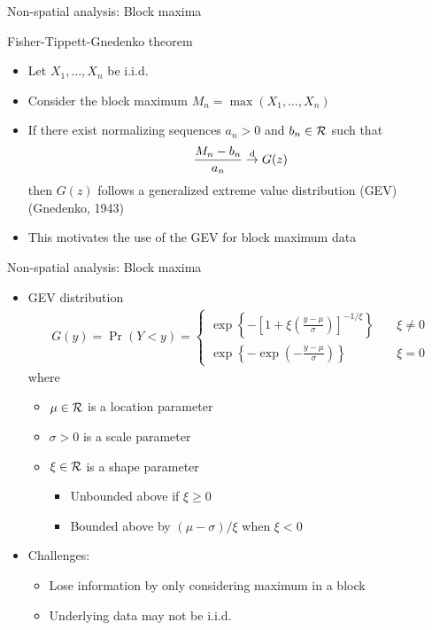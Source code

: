 \documentclass{beamer}
\begin{document}
 \begin{frame}{Non-spatial analysis: Block maxima}
 \begin{adjustwidth}{1em}{0em}
   Fisher-Tippett-Gnedenko theorem \vspace{1em}
   \begin{itemize} \setlength{\itemsep}{1em}
     \item Let $X_1, \ldots, X_n$ be i.i.d.
     \item Consider the block maximum $M_n = \max(X_1, \ldots, X_n)$
     \item If there exist normalizing sequences $a_n > 0$ and $b_n \in {\cal R}$ such that
     \begin{align*}
       \frac{ M_n - b_n }{ a_n } \stackrel{\mathrm{d}}{\rightarrow} G(z)
     \end{align*}
     then $G(z)$ follows a generalized extreme value distribution (GEV) (Gnedenko, 1943)
     \item This motivates the use of the GEV for block maximum data
   \end{itemize}
 \end{adjustwidth}
 \end{frame}

 \begin{frame}{Non-spatial analysis: Block maxima}
   \begin{itemize} \setlength{\itemsep}{1em}
     \item GEV distribution
     \begin{align*}
       G(y) = \Pr(Y < y) = \left\{  \begin{array}{ll}
         \exp\left\{ -\left[ 1 + \xi \left( \frac{ y - \mu }{ \sigma } \right) \right]^{ -1 / \xi} \right\} & \quad \xi \neq 0 \\[0.5em]
         \exp \left\{ -\exp \left( - \frac{ y - \mu }{ \sigma} \right) \right\} & \quad \xi = 0
       \end{array}\right.
     \end{align*}
     where
     \begin{itemize} \setlength{\itemsep}{0.25em}
       \item $\mu \in {\cal R}$ is a location parameter
       \item $\sigma > 0$ is a scale parameter
       \item $\xi \in {\cal R}$ is a shape parameter
       \begin{itemize}
         \item Unbounded above if $\xi \ge 0$
         \item Bounded above by $(\mu - \sigma) / \xi$ when $\xi < 0$
       \end{itemize}
     \end{itemize}
     \item Challenges:
     \begin{itemize}
       \item Lose information by only considering maximum in a block
       \item Underlying data may not be i.i.d.
     \end{itemize}
   \end{itemize}
 \end{frame}
\end{document}
